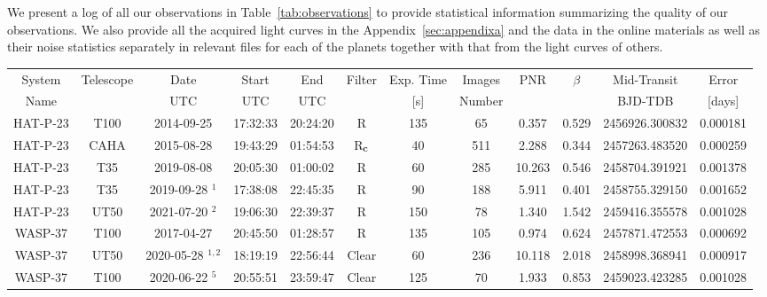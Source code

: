 \documentclass[a4paper,fleqn,usenatbib]{mnras}
\begin{document}
We present a log of all our observations in Table~\ref{tab:observations} to provide statistical information summarizing the quality of our observations. We also provide all the acquired light curves in the Appendix~\ref{sec:appendixa} and the data in the online materials as well as their noise statistics separately in relevant files for each of the planets together with that from the light curves of others.

\begin{table*}
  \scriptsize
\centering
	\caption{A log of photometric observations performed for this study. The dates of the light curves that are eliminated and hence not used in the TTV diagrams are marked and the reasons for the elimination are given in the footnotes.}
	\label{tab:observations}
        \begin{threeparttable}
	\begin{tabular}{cccccccccccc} 
		\hline
		System & Telescope & Date & Start  & End & Filter & Exp. Time & Images & PNR & $\beta$ & Mid-Transit & Error \\
                Name & & UTC & UTC & UTC & & [s] & Number &  &  & BJD-TDB & [days] \\ 
		\hline
		HAT-P-23 & T100 & 2014-09-25 & 17:32:33 & 20:24:20 & R & 135 & 65 & 0.357 & 0.529 & 2456926.300832 & 0.000181 \\
                HAT-P-23 & CAHA & 2015-08-28 & 19:43:29 & 01:54:53 & R$_{\rm c}$ & 40 & 511 & 2.288 & 0.344 & 2457263.483520 & 0.000259 \\
                HAT-P-23 & T35 & 2019-08-08 & 20:05:30 & 01:00:02 & R & 60 & 285 & 10.263 & 0.546 & 2458704.391921 & 0.001378 \\
                HAT-P-23 & T35 & 2019-09-28 $^1$ & 17:38:08 & 22:45:35 & R & 90 & 188  & 5.911 & 0.401 & 2458755.329150 & 0.001652 \\
                HAT-P-23 & UT50 & 2021-07-20 $^2$ & 19:06:30 & 22:39:37 & R & 150 & 78  & 1.340 & 1.542 & 2459416.355578 & 0.001028 \\
                WASP-37 & T100 & 2017-04-27 & 20:45:50 & 01:28:57 & R & 135 & 105 & 0.974 & 0.624 & 2457871.472553 & 0.000692 \\
                WASP-37 & UT50 & 2020-05-28 $^{1,2}$ & 18:19:19 & 22:56:44 & Clear & 60 & 236 & 10.118 & 2.018 & 2458998.368941 & 0.000917 \\
                WASP-37 & T100 & 2020-06-22 $^{5}$ & 20:55:51 & 23:59:47 & Clear & 125 & 70 & 1.933 & 0.853 & 2459023.423285 & 0.001028 \\

\end{tabular}
\end{threeparttable}
\end{table*}
\end{document}
